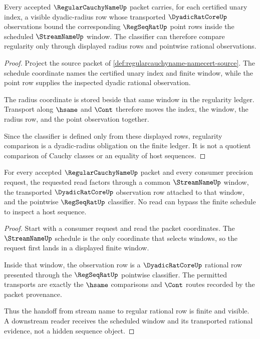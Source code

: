 \begin{theorem}
\label{thm:regularcauchyname-dyadic-radius-obligations}
Every accepted $\RegularCauchyNameUp$ packet carries, for each certified unary index, a visible dyadic-radius row whose transported $\DyadicRatCoreUp$ observations bound the corresponding $\RegSeqRatUp$ point rows inside the scheduled $\StreamNameUp$ window. The classifier can therefore compare regularity only through displayed radius rows and pointwise rational observations.
\end{theorem}
\begin{proof}
Project the source packet of \autoref{def:regularcauchyname-namecert-source}. The schedule coordinate names the certified unary index and finite window, while the point row supplies the inspected dyadic rational observation.

The radius coordinate is stored beside that same window in the regularity ledger. Transport along $\hsame$ and $\Cont$ therefore moves the index, the window, the radius row, and the point observation together.

Since the classifier is defined only from these displayed rows, regularity comparison is a dyadic-radius obligation on the finite ledger. It is not a quotient comparison of Cauchy classes or an equality of host sequences.
\end{proof}

\begin{theorem}
\label{thm:regularcauchyname-streamname-handoff}
For every accepted $\RegularCauchyNameUp$ packet and every consumer precision request, the requested read factors through a common $\StreamNameUp$ window, the transported $\DyadicRatCoreUp$ observation row attached to that window, and the pointwise $\RegSeqRatUp$ classifier. No read can bypass the finite schedule to inspect a host sequence.
\end{theorem}
\begin{proof}
Start with a consumer request and read the packet coordinates. The $\StreamNameUp$ schedule is the only coordinate that selects windows, so the request first lands in a displayed finite window.

Inside that window, the observation row is a $\DyadicRatCoreUp$ rational row presented through the $\RegSeqRatUp$ pointwise classifier. The permitted transports are exactly the $\hsame$ comparisons and $\Cont$ routes recorded by the packet provenance.

Thus the handoff from stream name to regular rational row is finite and visible. A downstream reader receives the scheduled window and its transported rational evidence, not a hidden sequence object.
\end{proof}

